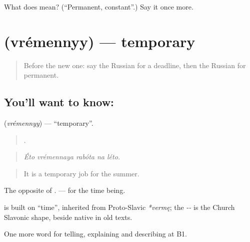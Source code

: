 \begin{tcolorbox}[breakable,colback=teal!4,colframe=teal!35!black,title={Before you move on}]
What does  mean? (\textquotedblleft{}Permanent, constant\textquotedblright{}.) Say it once more.
\end{tcolorbox}
\section[\texorpdfstring{\ru{временный} (vrémennyy)}{временный (vrémennyy)}]{ (vrémennyy) — temporary}

\label{lesson:RU-C380-vremennyy}



\begin{quote}
Before the new one: say the Russian for a deadline, then the Russian for permanent.
\end{quote}

\subsection*{You'll want to know: }
\textbf{} (\emph{vrémennyy}) — \textquotedblleft{}temporary\textquotedblright{}.

\begin{quote}
    .
\end{quote}

\begin{quote}
\emph{Éto vrémennaya rabóta na léto.}
\end{quote}

\begin{quote}
It is a temporary job for the summer.
\end{quote}

The opposite of \emph{}. \emph{} — for the time being.

\begin{cousinweb}
\textbf{} is built on \emph{} \textquotedblleft{}time\textquotedblright{}, inherited from Proto-Slavic \emph{*vermę}; the \emph{--} is the Church Slavonic shape, beside native \emph{} in old texts.
\end{cousinweb}

\begin{grammarlens}[title={What you've built}]
One more word for telling, explaining and describing at B1.
\end{grammarlens}

